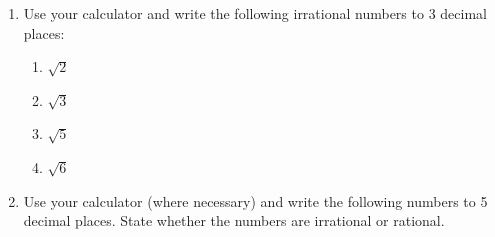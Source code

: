 \begin{enumerate}[noitemsep, label=\textbf{\arabic*}. ]
        \label{m38349*uid27}\item Use your calculator and write the following irrational numbers to 3 decimal places:
\label{m38349*id325991}\begin{enumerate}[noitemsep, label=\textbf{\alph*}. ] 
            \label{m38349*uid28}\item \begin{math}\sqrt{2}\end{math}\label{m38349*uid29}\item \begin{math}\sqrt{3}\end{math}\label{m38349*uid30}\item \begin{math}\sqrt{5}\end{math}\label{m38349*uid31}\item \begin{math}\sqrt{6}\end{math}\end{enumerate}
        \label{m38349*uid32}\item Use your calculator (where necessary) and write the following numbers to 5 decimal places. State whether the numbers are irrational or rational.
\label{m38349*id326080}\begin{enumerate}[noitemsep, label=\textbf{\alph*}. ] 

\end{enumerate}
\end{enumerate}
